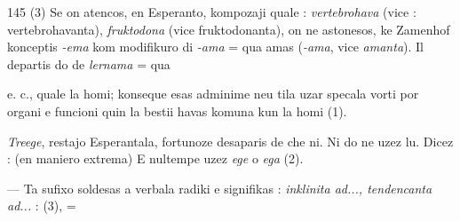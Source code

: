 \begin{VUpage}[149]{145}
{(3) Se on atencos, en Esperanto, kompozaji quale : \textit{vertebrohava}\nl
(vice : vertebrohavanta), \textit{fruktodona} (vice fruktodonanta), on ne\nl
astonesos, ke Zamenhof konceptis \textit{-ema} kom modifikuro di \textit{-ama} =\nl
qua amas (\textit{-ama}, vice \textit{amanta}). Il departis do de \textit{lernama} = qua\parplein%
}

\VUcontinue
{} e. c., quale la homi; konseque esas adminime neu\cc
tila uzar specala vorti por organi e funcioni quin la bestii\nl
havas komuna kun la homi (1).

\textit{Treege}, restajo Esperantala, fortunoze desaparis de che ni.\nl
Ni do ne uzez lu. Dicez :  (en maniero\nl
extrema) \nl
E nultempe uzez \textit{ege} o \textit{ega} (2).

 --- Ta sufixo soldesas a verbala radiki e signifikas :\nl
\textit{inklinita ad..., tendencanta ad...} :  (3),  =\parplein
\end{VUpage}

